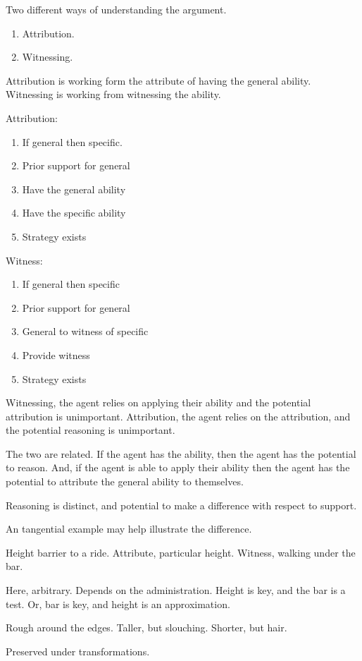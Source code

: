 \documentclass[10pt]{article}
\begin{document}
\begin{note}
  Two different ways of understanding the argument.
  \begin{enumerate}
  \item Attribution.
  \item Witnessing.
  \end{enumerate}
  Attribution is working form the attribute of having the general ability.
  Witnessing is working from witnessing the ability.

  \begin{multicols}{2}
    Attribution:
    \begin{enumerate}
    \item If general then specific.
    \item Prior support for general
    \item Have the general ability
    \item Have the specific ability
    \item Strategy exists
    \end{enumerate}

    Witness:
    \begin{enumerate}
    \item If general then specific
    \item Prior support for general
    \item General to witness of specific
    \item Provide witness
    \item Strategy exists
    \end{enumerate}
  \end{multicols}

  Witnessing, the agent relies on applying their ability and the potential attribution is unimportant.
  Attribution, the agent relies on the attribution, and the potential reasoning is unimportant.

  The two are related.
  If the agent has the ability, then the agent has the potential to reason.
  And, if the agent is able to apply their ability then the agent has the potential to attribute the general ability to themselves.

  Reasoning is distinct, and potential to make a difference with respect to support.
\end{note}

\begin{note}
  An tangential example may help illustrate the difference.

  Height barrier to a ride.
  Attribute, particular height.
  Witness, walking under the bar.

  Here, arbitrary.
  Depends on the administration.
  Height is key, and the bar is a test.
  Or, bar is key, and height is an approximation.

  Rough around the edges.
  Taller, but slouching.
  Shorter, but hair.

  Preserved under transformations.
\end{note}
\end{document}
